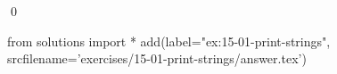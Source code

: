 
\begin{ex}
  \label{ex:15-01-print-strings}
  
  \qed
\end{ex}
\begin{python0}
from solutions import *
add(label="ex:15-01-print-strings",
    srcfilename='exercises/15-01-print-strings/answer.tex')
\end{python0}
